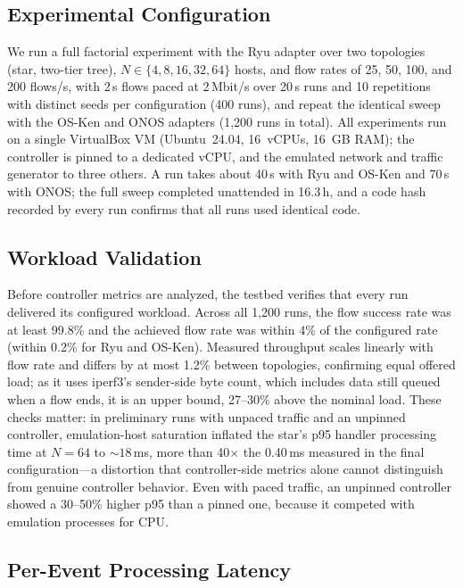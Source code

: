 \documentclass[conference]{IEEEtran}
\begin{document}
\subsection{Experimental Configuration}

We run a full factorial experiment with the Ryu adapter over two
topologies (star, two-tier tree), $N\in\{4,8,16,32,64\}$ hosts,
and flow rates of 25, 50, 100, and 200 flows/s, with 2\,s flows
paced at 2\,Mbit/s over 20\,s runs and 10 repetitions with
distinct seeds per configuration (400 runs), and repeat the
identical sweep with the OS-Ken and ONOS adapters (1{,}200 runs in
total). All experiments run on a single VirtualBox VM
(Ubuntu~24.04, 16~vCPUs, 16~GB RAM); the controller is pinned to a
dedicated vCPU, and the emulated network and traffic generator to
three others. A run takes about 40\,s with Ryu and OS-Ken and
70\,s with ONOS; the full sweep completed unattended in 16.3\,h,
and a code hash recorded by every run confirms that all runs used
identical code.

\subsection{Workload Validation}
\label{sec:workload}

Before controller metrics are analyzed, the testbed verifies that
every run delivered its configured workload. Across all 1{,}200
runs, the flow success rate was at least 99.8\% and the achieved
flow rate was within 4\% of the configured rate (within 0.2\% for
Ryu and OS-Ken). Measured throughput scales linearly with flow rate
and differs by at most 1.2\% between topologies, confirming equal
offered load; as it uses iperf3's sender-side byte count, which
includes data still queued when a flow ends, it is an upper bound,
27--30\% above the nominal load. These checks matter: in preliminary runs with unpaced traffic and
an unpinned controller, emulation-host saturation inflated the
star's p95 handler processing time at $N{=}64$ to ${\sim}18$\,ms,
more than 40$\times$ the 0.40\,ms measured in the final
configuration---a distortion that controller-side metrics alone
cannot distinguish from genuine controller behavior. Even with
paced traffic, an unpinned controller showed a 30--50\% higher p95
than a pinned one, because it competed with emulation processes
for CPU.

\subsection{Per-Event Processing Latency}
\end{document}
